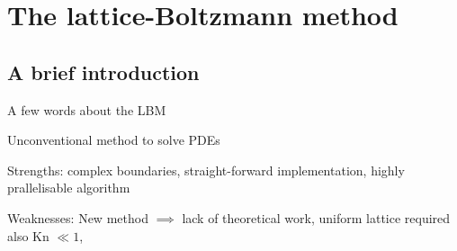 \section{The lattice-Boltzmann method}

\subsection{A brief introduction}

\begin{frame}{A few words about the LBM}

\begin{itemize*}

\item Unconventional method to solve PDEs

\item Strengths: complex boundaries, straight-forward implementation,
  highly prallelisable algorithm

\item Weaknesses: New method $\implies$ lack of theoretical work,
  uniform lattice required also Kn $\ll 1$, 


\end{itemize*}

\end{frame}


